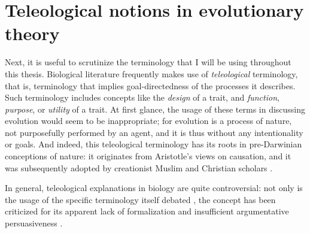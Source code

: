 \section{Teleological notions in evolutionary theory}
\label{sec:teleology}
Next, it is useful to scrutinize the terminology that I will be using throughout this thesis.
Biological literature frequently makes use of \emph{teleological} terminology, that is, terminology that implies goal-directedness of the processes it describes. Such terminology includes concepts like the \emph{design} of a trait, and \emph{function}, \emph{purpose}, or \emph{utility} of a trait.
At first glance, the usage of these terms in discussing evolution would seem to be inappropriate; for evolution is a process of nature, not purposefully performed by an agent, and it is thus without any intentionality or goals.
And indeed, this teleological terminology has its roots in pre-Darwinian conceptions of nature: it originates from Aristotle's views on causation, and it was subsequently adopted by creationist Muslim and Christian scholars \citep{Johnson05}.

In general, teleological explanations in biology are quite controversial: not only is the usage of the specific terminology itself debated \citep[p.~27 and references therein]{Ayala99}, the concept has been criticized for its apparent lack of formalization and insufficient argumentative persuasiveness \citep[p.~83]{Baedke2021}.

